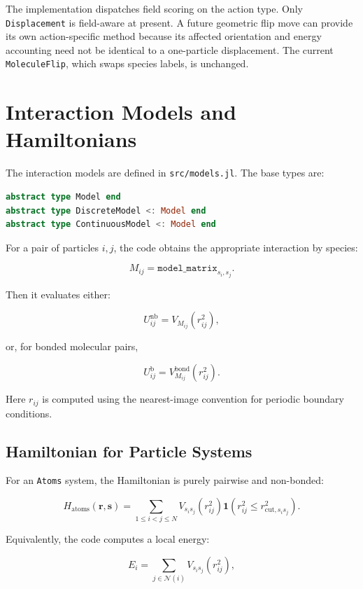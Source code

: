 \documentclass[11pt]{article}
\begin{document}
The implementation dispatches field scoring on the action type. Only
\texttt{Displacement} is field-aware at present. A future geometric flip move
can provide its own action-specific method because its affected orientation and
energy accounting need not be identical to a one-particle displacement. The
current \texttt{MoleculeFlip}, which swaps species labels, is unchanged.

\section{Interaction Models and Hamiltonians}

The interaction models are defined in \texttt{src/models.jl}. The base types are:

\begin{lstlisting}[language=Julia]
abstract type Model end
abstract type DiscreteModel <: Model end
abstract type ContinuousModel <: Model end
\end{lstlisting}

For a pair of particles \(i,j\), the code obtains the appropriate interaction by
species:

\[
M_{ij} = \texttt{model\_matrix}_{s_i,s_j}.
\]

Then it evaluates either:

\[
U_{ij}^{\mathrm{nb}} = V_{M_{ij}}(r_{ij}^2),
\]

or, for bonded molecular pairs,

\[
U_{ij}^{\mathrm{b}} = V_{M_{ij}}^{\mathrm{bond}}(r_{ij}^2).
\]

Here \(r_{ij}\) is computed using the nearest-image convention for periodic
boundary conditions.

\subsection{Hamiltonian for Particle Systems}

For an \texttt{Atoms} system, the Hamiltonian is purely pairwise and non-bonded:

\begin{equation}
H_{\mathrm{atoms}}(\mathbf{r}, \mathbf{s})
=
\sum_{1 \le i < j \le N}
V_{s_i s_j}(r_{ij}^2)
\mathbf{1}\!\left(r_{ij}^2 \le r_{\mathrm{cut},s_i s_j}^2\right).
\end{equation}

Equivalently, the code computes a local energy:

\begin{equation}
E_i
=
\sum_{j \in \mathcal{N}(i)}
V_{s_i s_j}(r_{ij}^2),
\end{equation}
\end{document}
